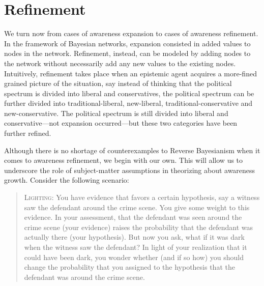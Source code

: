 \documentclass[
  11pt,
  dvipsnames,enabledeprecatedfontcommands]{scrartcl}
\begin{document}
\hypertarget{refinement}{%
\section{Refinement}\label{refinement}}

\label{sec:structural-both}

We turn now from cases of awareness expansion to cases of awareness
refinement. In the framework of Bayesian networks, expansion consisted
in added values to nodes in the network. Refinement, instead, can be
modeled by adding nodes to the network without necessarily add any new
values to the existing nodes. Intuitively, refinement takes place when
an epistemic agent acquires a more-fined grained picture of the
situation, say instead of thinking that the political spectrum is
divided into liberal and conservatives, the political spectrum can be
further divided into traditional-liberal, new-liberal,
traditional-conservative and new-conservative. The political spectrum is
still divided into liberal and conservative---not expansion
occurred---but these two categories have been further refined.

Although there is no shortage of counterexamples to Reverse Bayesianism
when it comes to awareness refinement, we begin with our own. This will
allow us to underscore the role of subject-matter assumptions in
theorizing about awareness growth. Consider the following scenario:

\begin{quote}
\textsc{Lighting:} You have evidence that favors a certain hypothesis, say a witness 
saw the defendant around the crime scene. You give some weight to this evidence. 
In your assessment, that the defendant was seen around the crime scene (your evidence) raises the probability that the defendant was actually there (your hypothesis). But now you ask, what if it was dark when the witness saw the defendant? In light of your realization that it could have been dark, you wonder whether (and if so how) you should change the probability that you assigned to the hypothesis that the defendant was around the crime scene.
\end{quote}
\end{document}
